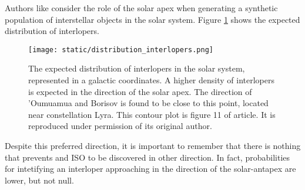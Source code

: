 Authors like \cite{marceta2023} consider the role of the solar apex when
generating a synthetic population of interstellar objects in the solar system.
Figure \ref{fig:distribution_interlopers} shows the expected distribution of
interlopers.

\vspace{1cm}

\begin{figure}[H]
  \centering
  \texttt{[image: static/distribution\_interlopers.png]}
        \caption[Expected interlopers distribution in the solar system.]{The
        expected distribution of interlopers in the solar system, represented in
        a galactic coordinates. A higher density of interlopers is expected in
        the direction of the solar apex. The direction of 'Oumuamua and Borisov
        is found to be close to this point, located near constellation Lyra.
        This contour plot is figure 11 of \cite{marceta2023} article. It is
        reproduced under permission of its original author.
        }
  \label{fig:distribution_interlopers}
\end{figure}

Despite this preferred direction, it is important to remember that there is
nothing that prevents and ISO to be discovered in other direction. In fact,
probabilities for intetifying an interloper approaching in the direction of the
solar-antapex are lower, but not null.
